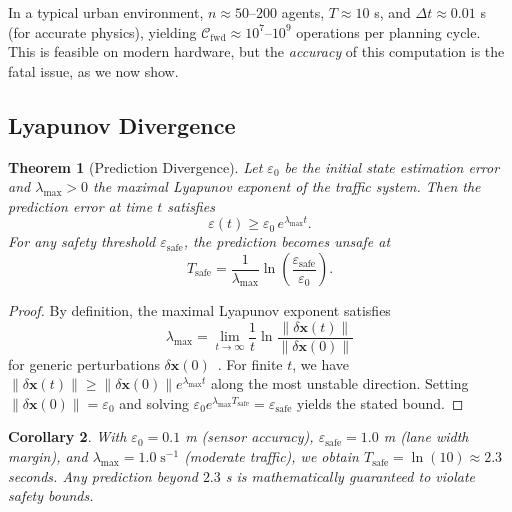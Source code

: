 \documentclass[twocolumn,10pt]{article}
\newtheorem{theorem}{Theorem}[section]
\newtheorem{corollary}[theorem]{Corollary}
\theoremstyle{definition}
\begin{document}
In a typical urban environment, $n \approx 50$--$200$ agents, $T \approx 10$ s, and $\Delta t \approx 0.01$ s (for accurate physics), yielding $\mathcal{C}_{\mathrm{fwd}} \approx 10^7$--$10^9$ operations per planning cycle. This is feasible on modern hardware, but the \emph{accuracy} of this computation is the fatal issue, as we now show.

\subsection{Lyapunov Divergence}

\begin{theorem}[Prediction Divergence]
\label{thm:lyapunov}
Let $\varepsilon_0$ be the initial state estimation error and $\lambda_{\max} > 0$ the maximal Lyapunov exponent of the traffic system. Then the prediction error at time $t$ satisfies
\begin{equation}
\varepsilon(t) \geq \varepsilon_0 \, e^{\lambda_{\max} t}.
\label{eq:lyapunov-divergence}
\end{equation}
For any safety threshold $\varepsilon_{\mathrm{safe}}$, the prediction becomes unsafe at
\begin{equation}
T_{\mathrm{safe}} = \frac{1}{\lambda_{\max}} \ln\!\left(\frac{\varepsilon_{\mathrm{safe}}}{\varepsilon_0}\right).
\end{equation}
\end{theorem}

\begin{proof}
By definition, the maximal Lyapunov exponent satisfies
\[
\lambda_{\max} = \lim_{t \to \infty} \frac{1}{t} \ln \frac{\|\delta \mathbf{x}(t)\|}{\|\delta \mathbf{x}(0)\|}
\]
for generic perturbations $\delta \mathbf{x}(0)$~\cite{arnold1978}. For finite $t$, we have $\|\delta \mathbf{x}(t)\| \geq \|\delta \mathbf{x}(0)\| e^{\lambda_{\max} t}$ along the most unstable direction. Setting $\|\delta \mathbf{x}(0)\| = \varepsilon_0$ and solving $\varepsilon_0 e^{\lambda_{\max} T_{\mathrm{safe}}} = \varepsilon_{\mathrm{safe}}$ yields the stated bound.
\end{proof}

\begin{corollary}
\label{cor:prediction-horizon}
With $\varepsilon_0 = 0.1$ m (sensor accuracy), $\varepsilon_{\mathrm{safe}} = 1.0$ m (lane width margin), and $\lambda_{\max} = 1.0\;\mathrm{s}^{-1}$ (moderate traffic), we obtain $T_{\mathrm{safe}} = \ln(10) \approx 2.3$ seconds. Any prediction beyond $2.3$ s is \emph{mathematically guaranteed} to violate safety bounds.
\end{corollary}
\end{document}
